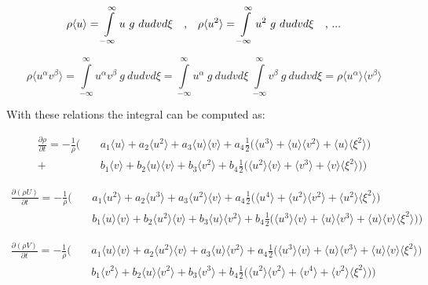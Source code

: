 \documentclass[
	pdftex,             %
	12pt,				%
	a4paper,		   	%
	english,				%
	oneside,			%
]{article}
\newcommand{\mom}[1]{\langle #1 \rangle}
\begin{document}
\begin{equation}
\rho \mom{u} = \int \limits^{\infty}_{-\infty} u ~g~ du dv d\xi
~~~\textnormal{,} ~~~
\rho \mom{u^2} = \int \limits^{\infty}_{-\infty} u^2 ~g~ du dv d\xi
~~~\textnormal{, ...}
\end{equation}

\begin{equation}
\rho \mom{u^\alpha v^\beta}
= 
\int \limits^{\infty}_{-\infty} u^\alpha v^\beta ~g~ du dv d\xi
=
\int \limits^{\infty}_{-\infty} u^\alpha ~g~ du dv d\xi ~ 
\int \limits^{\infty}_{-\infty} v^\beta  ~g~ du dv d\xi
=
\rho \mom{u^\alpha}\mom{v^\beta}
\end{equation}

With these relations the integral can be computed as:

\begin{eqnarray*}
\frac{\partial \rho}{\partial t}
=
-\frac{1}{\rho}
\Bigg(
 &~&a_1 \mom{u} + a_2 \mom{u^2} + a_3 \mom{u}\mom{v}
+   a_4 \frac{1}{2} \Big( \mom{u^3} + \mom{u}\mom{v^2} + \mom{u}\mom{\xi^2} \Big)
\\
+&~&b_1 \mom{v} + b_2 \mom{u}\mom{v} + b_3 \mom{v^2}
+   b_4  \frac{1}{2} \Big( \mom{u^2}\mom{v} + \mom{v^3} + \mom{v}\mom{\xi^2} \Big)
\Bigg)
\end{eqnarray*}

\begin{eqnarray*}
\frac{\partial (\rho U)}{\partial t}
=
-\frac{1}{\rho}
\Bigg(
&~&a_1 \mom{u^2} + a_2 \mom{u^3} + a_3 \mom{u^2}\mom{v}
+  a_4 \frac{1}{2} \Big( \mom{u^4} + \mom{u^2}\mom{v^2} + \mom{u^2}\mom{\xi^2} \Big)
\\
&~&b_1 \mom{u}\mom{v} + b_2 \mom{u^2}\mom{v} + b_3 \mom{u}\mom{v^2}
+  b_4 \frac{1}{2} \Big( \mom{u^3}\mom{v} + \mom{u}\mom{v^3} + \mom{u}\mom{v}\mom{\xi^2} \Big)
\Bigg)
\end{eqnarray*}

\begin{eqnarray*}
\frac{\partial (\rho V)}{\partial t}
=
-\frac{1}{\rho}
\Bigg(
&~&a_1 \mom{u}\mom{v} + a_2 \mom{u^2}\mom{v} + a_3 \mom{u}\mom{v^2}
+  a_4 \frac{1}{2} \Big( \mom{u^3}\mom{v} + \mom{u}\mom{v^3} + \mom{u}\mom{v}\mom{\xi^2} \Big)
\\
&~&b_1 \mom{v^2} + b_2 \mom{u}\mom{v^2} + b_3 \mom{v^3}
+  b_4 \frac{1}{2} \Big( \mom{u^2}\mom{v^2} + \mom{v^4} + \mom{v^2}\mom{\xi^2} \Big)
\Bigg)
\end{eqnarray*}
\end{document}
